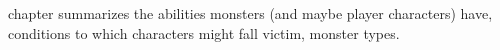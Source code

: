 {}
{}

 chapter summarizes the abilities monsters (and maybe player characters) have, conditions to which characters might fall victim, monster types.






